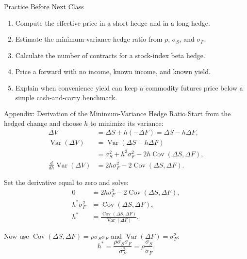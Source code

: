 \documentclass[aspectratio=169,11pt]{beamer}
\newcommand{\Var}{\operatorname{Var}}
\newcommand{\Cov}{\operatorname{Cov}}
\begin{document}
\begin{frame}{Practice Before Next Class}
    \begin{enumerate}
        \item Compute the effective price in a short hedge and in a long hedge.
        \item Estimate the minimum-variance hedge ratio from $\rho$, $\sigma_S$, and $\sigma_F$.
        \item Calculate the number of contracts for a stock-index beta hedge.
        \item Price a forward with no income, known income, and known yield.
        \item Explain when convenience yield can keep a commodity futures price below a simple cash-and-carry benchmark.
    \end{enumerate}
\end{frame}

\appendix

\begin{frame}[label=mvhr-appendix]{Appendix: Derivation of the Minimum-Variance Hedge Ratio}
    \footnotesize
    Start from the hedged change and choose \(h\) to minimize its variance:
    \[
        \begin{aligned}
            \Delta V &= \Delta S+h(-\Delta F)=\Delta S-h\Delta F, \\
            \Var(\Delta V)
            &= \Var(\Delta S-h\Delta F) \\
            &= \sigma_S^2+h^2\sigma_F^2-2h\Cov(\Delta S,\Delta F), \\
            \frac{d}{dh}\Var(\Delta V)
            &= 2h\sigma_F^2-2\Cov(\Delta S,\Delta F).
        \end{aligned}
    \]

    Set the derivative equal to zero and solve:
    \[
        \begin{aligned}
            0 &= 2h\sigma_F^2-2\Cov(\Delta S,\Delta F), \\
            h^*\sigma_F^2 &= \Cov(\Delta S,\Delta F), \\
            h^* &= \frac{\Cov(\Delta S,\Delta F)}{\Var(\Delta F)}.
        \end{aligned}
    \]

    Now use \(\Cov(\Delta S,\Delta F)=\rho\sigma_S\sigma_F\) and \(\Var(\Delta F)=\sigma_F^2\):
    \[
        h^*
        =
        \frac{\rho\sigma_S\sigma_F}{\sigma_F^2}
        =
        \rho\frac{\sigma_S}{\sigma_F}.
    \]

    \hyperlink{mvhr-main}{}
\end{frame}
\end{document}
